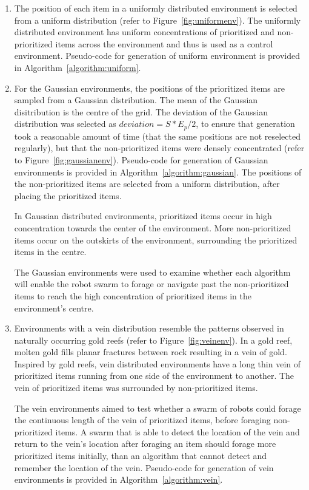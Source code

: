 \begin{enumerate}

\item The position of each item in a uniformly distributed environment is selected from a uniform distribution (refer to Figure~\ref{fig:uniformenv}). The uniformly distributed environment has uniform concentrations of prioritized and non-prioritized items across the environment and thus is used as a control environment. Pseudo-code for generation of uniform environment is provided in Algorithm~\ref{algorithm:uniform}.

\item For the Gaussian environments, the positions of the prioritized items are sampled from a Gaussian distribution. The mean of the Gaussian disitribution is the centre of the grid. The deviation of the Gaussian distribution was selected as $deviation = S*E_p/2$, to ensure that generation took a reasonable amount of time (that the same positions are not reselected regularly), but that the non-prioritized items were densely concentrated  (refer to Figure~\ref{fig:gaussianenv}). Pseudo-code for generation of Gaussian environments is provided in Algorithm~\ref{algorithm:gaussian}. The positions of the non-prioritized items are selected from a uniform distribution, after placing the prioritized items. 

In Gaussian distributed environments, prioritized items  occur in high concentration towards the center of the environment. More non-prioritized items occur on the outskirts of the environment, surrounding the prioritized items in the centre.

The Gaussian environments were used to examine whether each algorithm will enable the robot swarm to forage or navigate past the non-prioritized items to reach the high concentration of prioritized items in the environment's centre. 


\item Environments with a vein distribution resemble the patterns observed in naturally occurring gold reefs \cite{frimmel2002recent} (refer to Figure~\ref{fig:veinenv}). In a gold reef, molten gold fills planar fractures between rock resulting in a vein of gold. Inspired by gold reefs, vein distributed environments have a long thin vein of prioritized items running from one side of the environment to another. The vein of prioritized items was surrounded by non-prioritized items. 

The vein environments aimed to test whether a swarm of robots could forage the continuous length of the vein of prioritized items, before foraging non-prioritized items. A swarm that is able to detect the location of the vein and return to the vein's location after foraging an item should forage more prioritized items initially, than an algorithm that cannot detect and remember the location of the vein.  Pseudo-code for generation of vein environments is provided in Algorithm~\ref{algorithm:vein}.



\end{enumerate}
